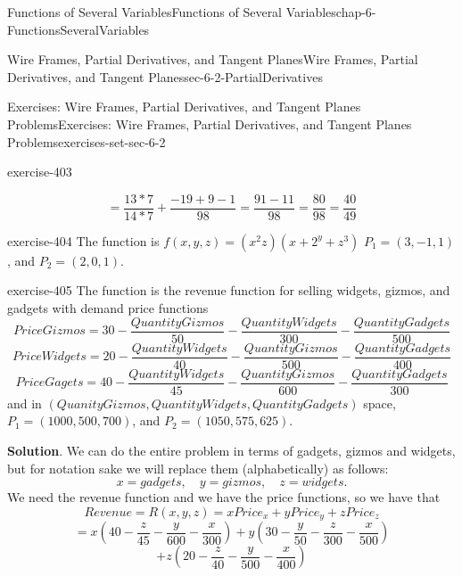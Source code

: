 \documentclass[oneside,10pt,]{book}
\numberwithin{equation}{section}
\begin{document}
\begin{chapterptx}{Functions of Several Variables}{}{Functions of Several Variables}{}{}{chap-6-FunctionsSeveralVariables}
\begin{sectionptx}{Wire Frames, Partial Derivatives, and Tangent Planes}{}{Wire Frames, Partial Derivatives, and Tangent Planes}{}{}{sec-6-2-PartialDerivatives}
\begin{exercises-subsection-numberless}{Exercises: Wire Frames, Partial Derivatives, and Tangent Planes Problems}{}{Exercises: Wire Frames, Partial Derivatives, and Tangent Planes Problems}{}{}{exercises-set-sec-6-2}
\begin{exercisegroup}
\begin{divisionexerciseeg}{9}{}{}{exercise-403}
\begin{enumerate}[label=(\alph*)]
\begin{equation*}
=\frac{13*7}{14*7}+\frac{-19+9-1}{98}=
\frac{91-11}{98}=\frac{80}{98}=\frac{40}{49}
\end{equation*}
\end{enumerate}
\end{divisionexerciseeg}%
\begin{divisionexerciseeg}{10}{}{}{exercise-404}%
\hypertarget{p-2311}{}%
The function is \(f(x,y,z)=(x^2 z)(x+2^y+z^3)\) \(P_1=(3,-1,1)\), and \(P_2=(2,0,1)\).%
\end{divisionexerciseeg}%
\begin{divisionexerciseeg}{11}{}{}{exercise-405}%
\hypertarget{p-2312}{}%
The function is the revenue function for selling widgets, gizmos, and gadgets with demand price functions%
\begin{equation*}
PriceGizmos=30-\frac{QuantityGizmos}{50}-\frac{QuantityWidgets}{300}-\frac{QuantityGadgets}{500}
\end{equation*}
%
\begin{equation*}
PriceWidgets=20-\frac{QuantityWidgets}{40}-\frac{QuantityGizmos}{500}-\frac{QuantityGadgets}{400}
\end{equation*}
%
\begin{equation*}
PriceGagets=40-\frac{QuantityWidgets}{45}-\frac{QuantityGizmos}{600}-\frac{QuantityGadgets}{300}
\end{equation*}
and in \((QuanityGizmos,QuantityWidgets,QuantityGadgets)\) space, \(P_1=(1000,500,700)\), and \(P_2=(1050,575,625)\).%
\par\smallskip%
\noindent\textbf{Solution}.\hypertarget{solution-204}{}\quad%
\hypertarget{p-2313}{}%
We can do the entire problem in terms of gadgets, gizmos and widgets, but for notation sake we will replace them (alphabetically) as follows:%
%
\begin{equation*}
x=gadgets,\quad y=gizmos,\quad z=widgets.
\end{equation*}
\hypertarget{p-2314}{}%
We need the revenue function and we have the price functions, so we have that%
%
\begin{equation*}
Revenue=R(x,y,z)= x Price_x+y Price_y+z Price_z
\end{equation*}
%
\begin{equation*}
=x \left(40-\frac{z}{45}-\frac{y}{600}-\frac{x}{300}\right)
+y\left(30-\frac{y}{50}-\frac{z}{300}-\frac{x}{500}\right)
\end{equation*}
%
\begin{equation*}
+z\left(20-\frac{z}{40}-\frac{y}{500}-\frac{x}{400}\right)

\end{equation*}
\end{divisionexerciseeg}
\end{exercisegroup}
\end{exercises-subsection-numberless}
\end{sectionptx}
\end{chapterptx}
\end{document}
